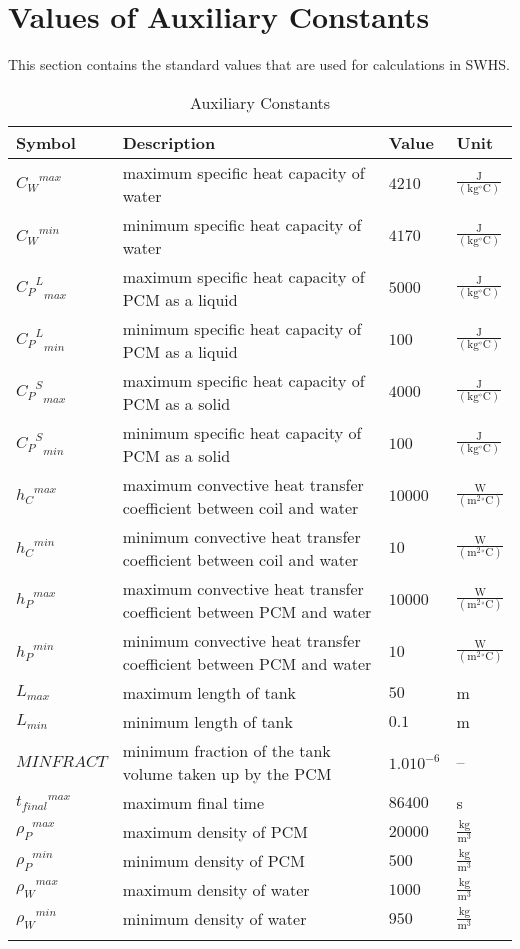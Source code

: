 \documentclass[12pt]{article}
\begin{document}
\section{Values of Auxiliary Constants}
\label{Sec:AuxConstants}
This section contains the standard values that are used for calculations in SWHS.
\begin{longtabu}{l X[l] l l}
\toprule
Symbol & Description & Value & Unit
\\
\midrule
${{C_{W}}^{max}}$ & maximum specific heat capacity of water & $4210$ & $\frac{\text{J}}{(\text{kg}{}^{\circ}\text{C})}$
\\
${{C_{W}}^{min}}$ & minimum specific heat capacity of water & $4170$ & $\frac{\text{J}}{(\text{kg}{}^{\circ}\text{C})}$
\\
${{{C_{P}}^{L}}_{max}}$ & maximum specific heat capacity of PCM as a liquid & $5000$ & $\frac{\text{J}}{(\text{kg}{}^{\circ}\text{C})}$
\\
${{{C_{P}}^{L}}_{min}}$ & minimum specific heat capacity of PCM as a liquid & $100$ & $\frac{\text{J}}{(\text{kg}{}^{\circ}\text{C})}$
\\
${{{C_{P}}^{S}}_{max}}$ & maximum specific heat capacity of PCM as a solid & $4000$ & $\frac{\text{J}}{(\text{kg}{}^{\circ}\text{C})}$
\\
${{{C_{P}}^{S}}_{min}}$ & minimum specific heat capacity of PCM as a solid & $100$ & $\frac{\text{J}}{(\text{kg}{}^{\circ}\text{C})}$
\\
${{h_{C}}^{max}}$ & maximum convective heat transfer coefficient between coil and water & $10000$ & $\frac{\text{W}}{(\text{m}^{2}{}^{\circ}\text{C})}$
\\
${{h_{C}}^{min}}$ & minimum convective heat transfer coefficient between coil and water & $10$ & $\frac{\text{W}}{(\text{m}^{2}{}^{\circ}\text{C})}$
\\
${{h_{P}}^{max}}$ & maximum convective heat transfer coefficient between PCM and water & $10000$ & $\frac{\text{W}}{(\text{m}^{2}{}^{\circ}\text{C})}$
\\
${{h_{P}}^{min}}$ & minimum convective heat transfer coefficient between PCM and water & $10$ & $\frac{\text{W}}{(\text{m}^{2}{}^{\circ}\text{C})}$
\\
${L_{max}}$ & maximum length of tank & $50$ & m
\\
${L_{min}}$ & minimum length of tank & $0.1$ & m
\\
$MINFRACT$ & minimum fraction of the tank volume taken up by the PCM & $1.0 10^{-6}$ & --
\\
${{t_{final}}^{max}}$ & maximum final time & $86400$ & s
\\
${{ρ_{P}}^{max}}$ & maximum density of PCM & $20000$ & $\frac{\text{kg}}{\text{m}^{3}}$
\\
${{ρ_{P}}^{min}}$ & minimum density of PCM & $500$ & $\frac{\text{kg}}{\text{m}^{3}}$
\\
${{ρ_{W}}^{max}}$ & maximum density of water & $1000$ & $\frac{\text{kg}}{\text{m}^{3}}$
\\
${{ρ_{W}}^{min}}$ & minimum density of water & $950$ & $\frac{\text{kg}}{\text{m}^{3}}$
\\
\bottomrule
\caption{Auxiliary Constants}
\label{Table:TAuxConsts}
\end{longtabu}
\end{document}

